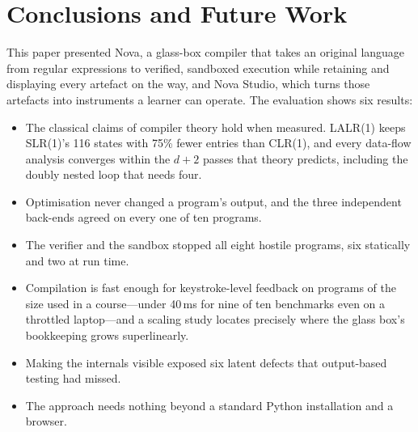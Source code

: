 \documentclass[conference]{IEEEtran}
\begin{document}
\section{Conclusions and Future Work}
\label{sec:conclusion}
This paper presented Nova, a glass-box compiler that takes an original language from regular expressions to verified, sandboxed execution while retaining and displaying every artefact on the way, and Nova Studio, which turns those artefacts into instruments a learner can operate. The evaluation shows six results:
\begin{itemize}
\item The classical claims of compiler theory hold when measured. LALR(1) keeps SLR(1)'s 116 states with 75\% fewer entries than CLR(1), and every data-flow analysis converges within the $d+2$ passes that theory predicts, including the doubly nested loop that needs four.
\item Optimisation never changed a program's output, and the three independent back-ends agreed on every one of ten programs.
\item The verifier and the sandbox stopped all eight hostile programs, six statically and two at run time.
\item Compilation is fast enough for keystroke-level feedback on programs of the size used in a course---under 40\,ms for nine of ten benchmarks even on a throttled laptop---and a scaling study locates precisely where the glass box's bookkeeping grows superlinearly.
\item Making the internals visible exposed six latent defects that output-based testing had missed.
\item The approach needs nothing beyond a standard Python installation and a browser.
\end{itemize}
\end{document}
